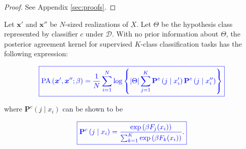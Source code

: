 \begin{proof}
    See Appendix \ref{sec:proofs}.
\end{proof}

\begin{theorem}[\textcolor{blue}{PA kernel for classification}]
    Let $\bm{x}'$ and $\bm{x}''$ be $N$-sized realizations of $\underbar{X}$.
    Let $\Theta$ be the hypothesis class represented by classifier $c$ under $\mathcal{D}$.
    With no prior information about $\Theta$, the posterior agreement kernel
    for supervised $K$-class classification tasks has the following expression:

    $$
    \textcolor{blue}{
        \boxed{
            \operatorname{PA}\left(\bm{x}', \bm{x}'' ; \beta\right)=\frac{1}{N} \sum_{i=1}^N \log \left\{|\Theta| \sum_{j =1}^K \mathbf{P}^c\left(j \mid x_i' \right) \mathbf{P}^c \left( j \mid x_i'' \right)\right\}
        }
    }
    $$

    where $\mathbf{P}^c(j \mid x_i)$ can be shown to be

    $$
    \textcolor{blue}{
        \boxed{
            \mathbf{P}^c\left(j \mid x_i\right)=\frac{\exp\left(\beta F_{j}(x_i)\right)}{\sum_{k=1}^K\exp\left(\beta F_k(x_i)\right)}.
        }
    }
    $$
\end{theorem}

